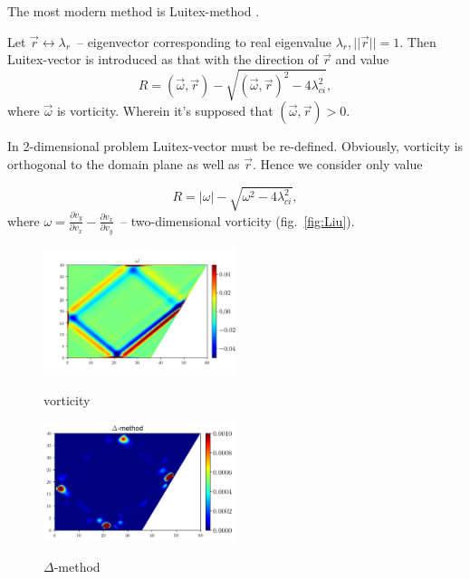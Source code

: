 \documentclass[a4wide,fontsize=12pt]{article}
\begin{document}
The most modern method is Luitex-method \cite{vortex}.

Let $\vec r \longleftrightarrow \lambda_r$~-- eigenvector corresponding to real eigenvalue $\lambda_r, ||\vec r||=1$. Then Luitex-vector is introduced as that with the direction of $\vec r$ and value
 $$R=(\vec \omega,\vec r)-\sqrt{(\vec \omega,\vec r)^2-4\lambda_{ci}^2},$$\noindent where $\vec \omega$ is vorticity. Wherein it's supposed that $(\vec \omega,\vec r)>0$.
 
 In 2-dimensional problem Luitex-vector must be re-defined. Obviously, vorticity is orthogonal to the domain plane as well as $\vec r$. Hence we consider only value
 
 $$R=|\omega|- \sqrt{\omega^2-4\lambda_{ci}^2},$$\noindent where $\omega=\frac{\partial v_y}{\partial v_x}-\frac{\partial v_x}{\partial v_y}$~-- two-dimensional vorticity (fig.~\ref{fig:Liu}).

\begin{figure}
\begin{multicols}{2}
    \centering
    \includegraphics[width=0.5\textwidth]{Figs/VortexRot.png}
    \caption{vorticity}
    \label{fig:vorticity}
    \hfill
    \includegraphics[width=0.5\textwidth]{Figs/VortexDelta.png}
    \caption{$\Delta$-method}
    \label{fig:Delta}
\end{multicols}
\end{figure}
\end{document}
